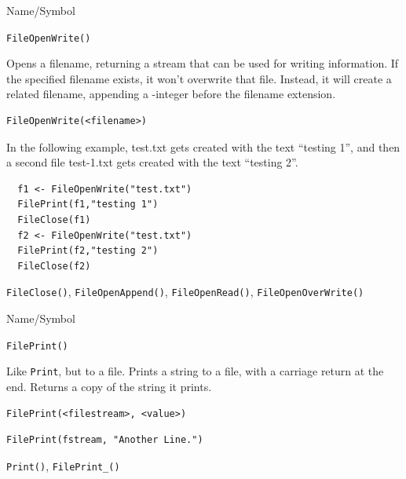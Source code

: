 \begin{desc}{Name/Symbol}
\item[Name/Symbol]	\verb+FileOpenWrite()+

\item[Description] Opens a filename, returning a stream that can be
  used for writing information.  If the specified filename exists, it
  won't overwrite that file.  Instead, it will create a related
  filename, appending a -integer before the filename extension.


\item[Usage]
\begin{verbatim}
FileOpenWrite(<filename>)
\end{verbatim}

\item[Example]	

In the following example, test.txt gets created with the text
``testing 1'', and then a second file test-1.txt gets created with the
text ``testing 2''.

\begin{verbatim}
  f1 <- FileOpenWrite("test.txt")
  FilePrint(f1,"testing 1")
  FileClose(f1)
  f2 <- FileOpenWrite("test.txt")
  FilePrint(f2,"testing 2")
  FileClose(f2)
\end{verbatim}

\item[See Also]	\verb+FileClose()+, \verb+FileOpenAppend()+, \verb+FileOpenRead()+, \verb+FileOpenOverWrite()+
\end{desc}



\begin{desc}{Name/Symbol}
\item[Name/Symbol]	\verb+FilePrint()+

\item[Description]	Like \verb+Print+, but to a file.  Prints a string to a file, 
		with a carriage return at the end.  Returns a
  copy of the string it prints.
	
\item[Usage]
\begin{verbatim}
FilePrint(<filestream>, <value>)
\end{verbatim}

\item[Example]
\begin{verbatim}
FilePrint(fstream, "Another Line.")
\end{verbatim}

\item[See Also]	\verb+Print()+, \verb+FilePrint_()+
\end{desc}



